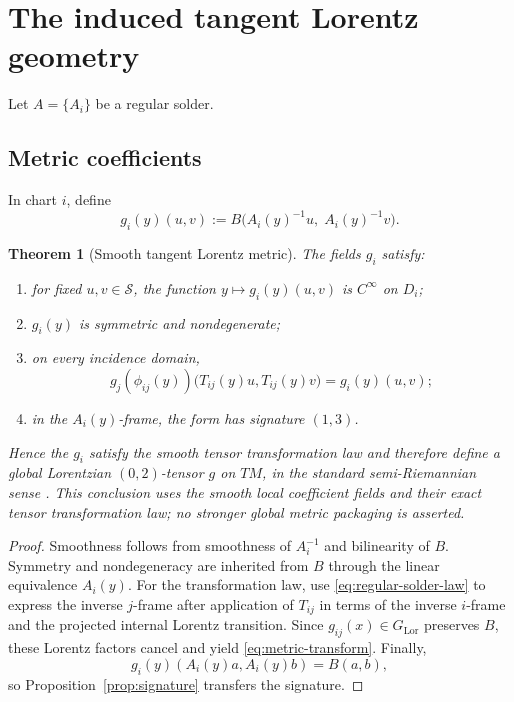 \documentclass[11pt,a4paper]{article}
\newtheorem{theorem}{Theorem}[section]
\theoremstyle{definition}
\theoremstyle{remark}
\newcommand{\Smodel}{\mathcal{S}}
\newcommand{\LorG}{G_{\mathrm{Lor}}}
\begin{document}
\section{The induced tangent Lorentz geometry}
\label{sec:metric}

Let \(A=\{A_i\}\) be a regular solder.

\subsection{Metric coefficients}

In chart \(i\), define
\[
   g_i(y)(u,v)
   :=
   B\bigl(A_i(y)^{-1}u,\;A_i(y)^{-1}v\bigr).
\tag{8.1}\label{eq:metric-coeff}
\]

\begin{theorem}[Smooth tangent Lorentz metric]
\label{thm:smooth-metric}
The fields \(g_i\) satisfy:
\begin{enumerate}
\item for fixed \(u,v\in\Smodel\), the function
      \(y\mapsto g_i(y)(u,v)\) is \(C^\infty\) on \(D_i\);
\item \(g_i(y)\) is symmetric and nondegenerate;
\item on every incidence domain,
\[
  g_j(\phi_{ij}(y))
     \bigl(T_{ij}(y)u,T_{ij}(y)v\bigr)
  =
  g_i(y)(u,v);
\tag{8.2}\label{eq:metric-transform}
\]
\item in the \(A_i(y)\)-frame, the form has signature \((1,3)\).
\end{enumerate}
Hence the \(g_i\) satisfy the smooth tensor transformation law and
therefore define a global Lorentzian \((0,2)\)-tensor \(g\) on \(TM\), in
the standard semi-Riemannian sense \cite{ONeill,Nakahara}.  This conclusion
uses the smooth local coefficient fields and their exact tensor
transformation law; no stronger global metric packaging is asserted.
\end{theorem}

\begin{proof}
Smoothness follows from smoothness of \(A_i^{-1}\) and bilinearity of
\(B\).  Symmetry and nondegeneracy are inherited from \(B\) through the
linear equivalence \(A_i(y)\).  For the transformation law, use
\eqref{eq:regular-solder-law} to express the inverse \(j\)-frame after application of
\(T_{ij}\) in terms of the inverse \(i\)-frame and the projected internal
Lorentz transition.  Since \(g_{ij}(x)\in\LorG\) preserves \(B\), these
Lorentz factors cancel and yield \eqref{eq:metric-transform}.  Finally,
\[
   g_i(y)(A_i(y)a,A_i(y)b)=B(a,b),
\]
so Proposition~\ref{prop:signature} transfers the signature.
\end{proof}
\end{document}
